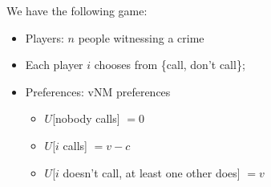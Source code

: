 \begin{illustration}
      We have the following game:
      \begin{itemize}
            \item Players: $n$ people witnessing a crime
            \item Each player $i$ chooses from \{call, don't call\};
            \item Preferences: vNM preferences
                  \begin{itemize}
                        \item $U$[nobody calls] $=0$
                        \item $U$[$i$ calls] $=v-c$
                        \item $U$[$i$ doesn't call, at least one other does] $= v$
                  \end{itemize}
      \end{itemize}
      

\end{illustration}
